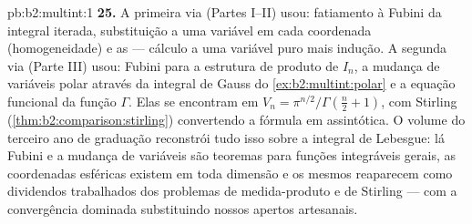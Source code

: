 \begin{solution}{pb:b2:multint:1}
\textbf{25.} A primeira via (Partes I--II) usou: fatiamento à Fubini
da integral iterada, substituição a uma variável
em cada coordenada (homogeneidade) e as 
--- cálculo a uma variável puro mais indução. A segunda via
(Parte III) usou: Fubini para a estrutura de produto de $I_n$,
a mudança de variáveis polar através da integral de Gauss do
\cref{ex:b2:multint:polar} e a equação funcional da função
$\Gamma$. Elas se encontram em $V_n =
\pi^{n/2}/\Gamma(\frac n2 + 1)$, com Stirling
(\cref{thm:b2:comparison:stirling}) convertendo a fórmula
em assintótica. O volume do terceiro ano de graduação reconstrói tudo isso sobre
a integral de Lebesgue: lá Fubini e a mudança de variáveis
são teoremas para funções integráveis gerais, as coordenadas
esféricas existem em toda dimensão e os mesmos  reaparecem como dividendos trabalhados dos
problemas de medida-produto e de Stirling --- com a convergência
dominada substituindo nossos apertos artesanais.
\end{solution}
